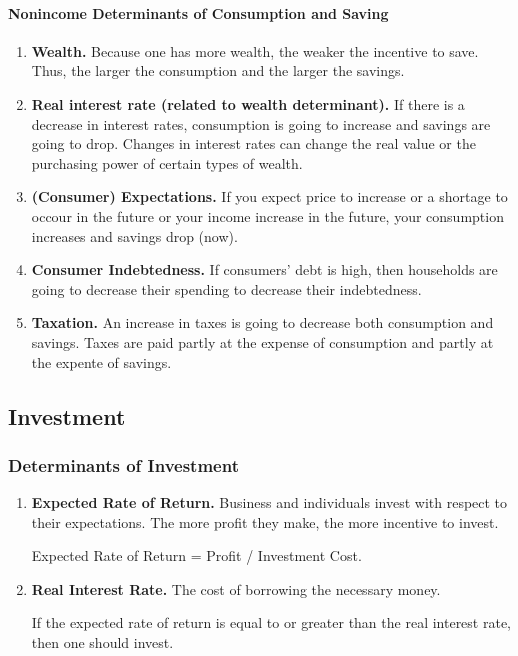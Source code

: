 
\paragraph{Nonincome Determinants of Consumption and Saving}

\begin{enumerate}[label = (\alph*)]
	\item \textbf{Wealth.} Because one has more wealth, the weaker the incentive to save. Thus, the larger the consumption and the larger the savings.

	\item \textbf{Real interest rate (related to wealth determinant).} If there is a decrease in interest rates, consumption is going to increase and savings are going to drop. Changes in interest rates can change the real value or the purchasing power of certain types of wealth.

	\item \textbf{(Consumer) Expectations.} If you expect price to increase or a shortage to occour in the future or your income increase in the future, your consumption increases and savings drop (now).

	\item \textbf{Consumer Indebtedness.} If consumers' debt is high, then households are going to decrease their spending to decrease their indebtedness.

	\item \textbf{Taxation.} An increase in taxes is going to decrease both consumption and savings. Taxes are paid partly at the expense of consumption and partly at the expente of savings.

\end{enumerate}

\subsection{Investment}

\subsubsection{Determinants of Investment}

\begin{enumerate}[label = (\arabic*)]
	\item \textbf{Expected Rate of Return.} Business and individuals invest with respect to their expectations. The more profit they make, the more incentive to invest. 

		Expected Rate of Return = Profit / Investment Cost.

	\item \textbf{Real Interest Rate.} The cost of borrowing the necessary money.

		If the expected rate of return is equal to or greater than the real interest rate, then one should invest.

\end{enumerate}

